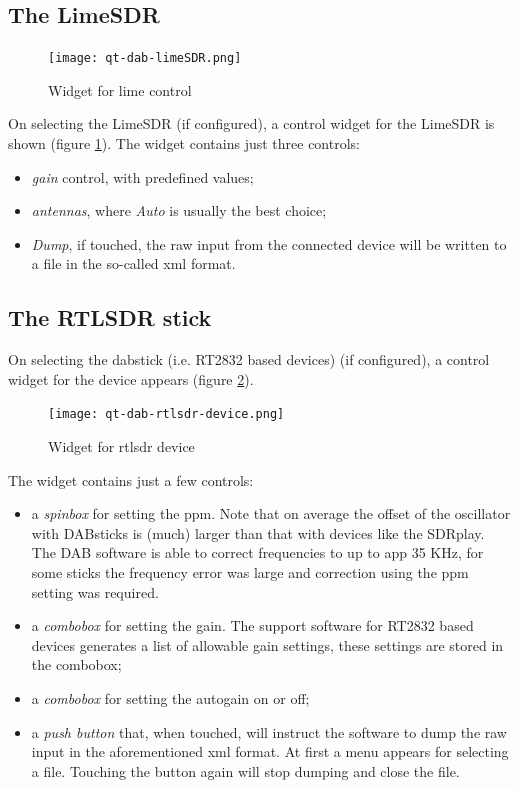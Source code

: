 \documentclass[12pt]{article}
\begin{document}
\subsection{The LimeSDR}
\begin{figure}[htp]
\centering
\texttt{[image: qt-dab-limeSDR.png]}
\caption{Widget for lime control}
\label{figure:limecontrol}
\end{figure}

On selecting the LimeSDR (if configured), a control widget for the LimeSDR
is shown (figure \ref{figure:limecontrol}).
The widget contains just three controls:
\begin{itemize}
\item {\em gain} control, with predefined values;
\item {\em antennas}, where {\em Auto} is usually the best choice;
\item {\em Dump}, if touched, the raw input from the connected device
will be written to a file in the so-called xml format.
\end{itemize}
\subsection{The RTLSDR stick}
On selecting the dabstick (i.e. RT2832 based devices) (if configured),
a control widget for the device appears (figure \ref{figure:rtlsdrcontrol}).
\begin{figure}[htp]
\centering
\texttt{[image: qt-dab-rtlsdr-device.png]}
\caption{Widget for rtlsdr device}
\label{figure:rtlsdrcontrol}
\end{figure}

The widget contains just a few controls:
\begin{itemize}
\item a {\em spinbox} for setting the ppm. Note that on average the offset
of the oscillator with DABsticks is (much) larger than that with devices
like the SDRplay. The DAB software is able to correct frequencies
to up to app 35 KHz, for some sticks the frequency error was large and
correction using the ppm setting was required.
\item a {\em combobox} for setting the gain.
The support software for RT2832 based
devices generates a list of allowable gain settings, these settings
are stored in the combobox;
\item a {\em combobox} for setting the autogain on or off;
\item a {\em push button} that, when touched, will instruct the software to
dump the raw input in the aforementioned xml format. At first a menu
appears for selecting a file. Touching the button again will stop dumping
and close the file.
\end{itemize}
\end{document}
